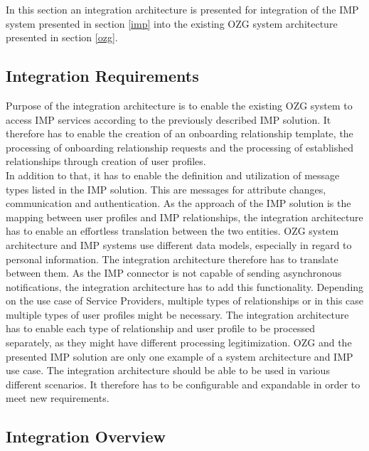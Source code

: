 In this section an integration architecture is presented for integration of the IMP system presented in section \ref{imp} into the existing OZG system architecture presented in section \ref{ozg}. 

\subsection{Integration Requirements}
Purpose of the integration architecture is to enable the existing OZG system to access IMP services according to the previously described IMP solution. It therefore has to enable the creation of an onboarding relationship template, the processing of onboarding relationship requests and the processing of established relationships through creation of user profiles. \\ 
In addition to that, it has to enable the definition and utilization of message types listed in the IMP solution. This are messages for attribute changes, communication and authentication. As the approach of the IMP solution is the mapping between user profiles and IMP relationships, the integration architecture has to enable an effortless translation between the two entities. OZG system architecture and IMP systems use different data models, especially in regard to personal information. The integration architecture therefore has to translate between them. As the IMP connector is not capable of sending asynchronous notifications, the integration architecture has to add this functionality. Depending on the use case of Service Providers, multiple types of relationships or in this case multiple types of user profiles might be necessary. The integration architecture has to enable each type of relationship and user profile to be processed separately, as they might have different processing legitimization. OZG and the presented IMP solution are only one example of a system architecture and IMP use case. The integration architecture should be able to be used in various different scenarios. It therefore has to be configurable and expandable in order to meet new requirements.


\subsection{Integration Overview}

